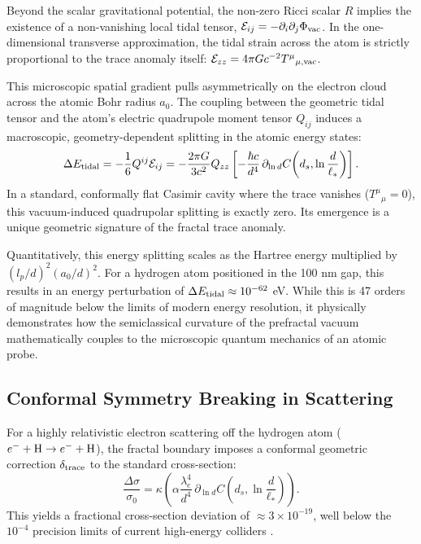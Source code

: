 \documentclass[12pt,letterpaper]{article}
\begin{document}
Beyond the scalar gravitational potential, the non-zero Ricci scalar $R$ implies the existence of a non-vanishing local tidal tensor, $\mathcal{E}_{ij} = -\partial_i \partial_j \Phi_{\rm vac}$. In the one-dimensional transverse approximation, the tidal strain across the atom is strictly proportional to the trace anomaly itself: $\mathcal{E}_{zz} = 4\pi G c^{-2} T^\mu{}_{\mu, \rm vac}$. 

This microscopic spatial gradient pulls asymmetrically on the electron cloud across the atomic Bohr radius $a_0$. The coupling between the geometric tidal tensor and the atom's electric quadrupole moment tensor $Q_{ij}$ induces a macroscopic, geometry-dependent splitting in the atomic energy states:
\begin{equation}
\Delta E_{\rm tidal} = -\frac{1}{6} Q^{ij} \mathcal{E}_{ij} = -\frac{2\pi G}{3 c^2} Q_{zz} \left[ -\frac{\hbar c}{d^4} \,\partial_{\ln d}C\!\left(d_s,\ln\frac{d}{\ell_*}\right) \right].
\label{eq:Quadrupole_shift}
\end{equation}
In a standard, conformally flat Casimir cavity where the trace vanishes ($T^\mu{}_\mu = 0$), this vacuum-induced quadrupolar splitting is exactly zero. Its emergence is a unique geometric signature of the fractal trace anomaly. 

Quantitatively, this energy splitting scales as the Hartree energy multiplied by $(l_p/d)^2 (a_0/d)^2$. For a hydrogen atom positioned in the 100 nm gap, this results in an energy perturbation of $\Delta E_{\rm tidal} \approx 10^{-62}$ eV. While this is 47 orders of magnitude below the limits of modern energy resolution, it physically demonstrates how the semiclassical curvature of the prefractal vacuum mathematically couples to the microscopic quantum mechanics of an atomic probe.

\subsection{Conformal Symmetry Breaking in Scattering}

For a highly relativistic electron scattering off the hydrogen atom ($e^- + {\rm H} \to e^- + {\rm H}$), the fractal boundary imposes a conformal geometric correction $\delta_{\rm trace}$ to the standard cross-section:
\begin{equation}
\frac{\Delta \sigma}{\sigma_0} = \kappa \left( \alpha \frac{\lambda_e^4}{d^4} \,\partial_{\ln d} C\!\left(d_s,\ln\frac{d}{\ell_*}\right) \right).
\label{eq:Scattering_cross_section}
\end{equation}
This yields a fractional cross-section deviation of $\approx 3 \times 10^{-19}$, well below the $10^{-4}$ precision limits of current high-energy colliders \cite{workman2022}.
\end{document}
